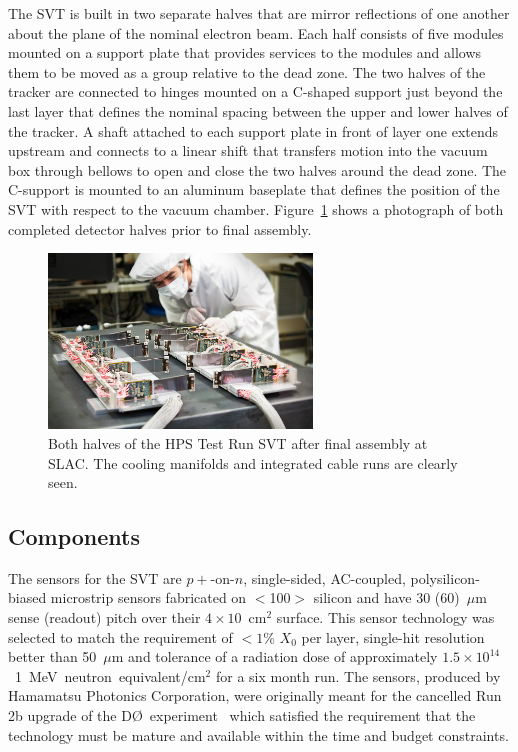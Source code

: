 \documentclass[final,3p,times,twocolumn]{elsarticle}
\newcommand{\fluenceunit}{1~MeV~neutron~equivalent/cm\ensuremath{^2}}
\begin{document}
The SVT is built in two separate halves that are mirror reflections of one another about the plane of 
the nominal electron beam.  Each half consists of five modules mounted on a support plate that 
provides services to the modules and allows them to be moved as a group relative to the dead zone. 
The two halves of the tracker are connected to hinges mounted on a C-shaped support just beyond 
the last layer that defines the nominal spacing between the upper and lower halves of the tracker.  A 
shaft attached to each support plate in front of layer one extends upstream and connects to a linear shift 
that transfers motion into the vacuum box through bellows to open and close the two halves around 
the dead zone. The C-support is mounted to an aluminum baseplate that defines the position of the 
SVT with respect to the vacuum chamber. Figure~\ref{fig:tracker_halves} shows a photograph of both 
completed detector halves prior to final assembly. 
\begin{figure}[htp]
\begin{center}
    \includegraphics[width=7cm]{2012-101-PHOTON-DETECTOR-001}
\caption{\small Both halves of the HPS Test Run SVT after final assembly at SLAC.  The cooling manifolds and 
integrated cable runs are clearly seen.
\label{fig:tracker_halves}}
\end{center}
\end{figure}

\subsection{Components}
The sensors for the SVT are $p+$-on-$n$, single-sided, AC-coupled, polysilicon-biased microstrip 
sensors fabricated on $<$100$>$ silicon and have 30 (60)~$\mu$m sense (readout) pitch over their 
$4\times10$~cm$^2$ surface. This sensor technology was selected to match the requirement of 
$<1$\% $X_0$ per layer, single-hit resolution better than 50~$\mu$m and tolerance of a radiation 
dose of approximately $1.5\times10^{14}$~\fluenceunit{} for a six month run. The sensors, produced by 
Hamamatsu Photonics Corporation, were originally meant for the cancelled 
Run 2b upgrade of the D\O~experiment~\cite{Denisov:2001aa} which satisfied the requirement that 
the technology must be mature and available within the time and budget constraints.
\end{document}
